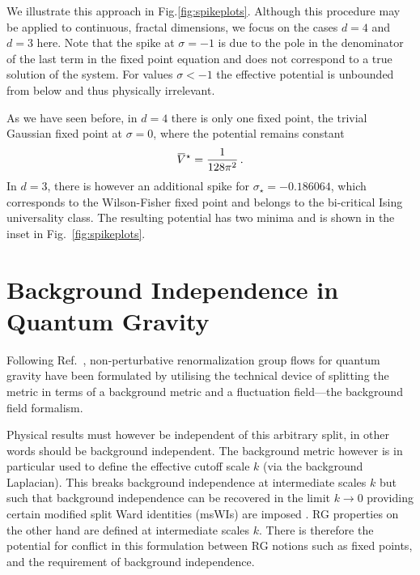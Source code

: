 \documentclass[11pt]{book}
\newcommand{\overbar}[1]{\mkern 1.5mu\overline{\mkern-1.5mu#1\mkern-1.5mu}\mkern 1.5mu}
\newcommand{\bV}{\overbar V}
\numberwithin{equation}{chapter}
\begin{document}
We illustrate this approach in Fig.\ref{fig:spikeplots}.
Although this procedure may be applied to continuous, fractal dimensions, we focus
on the cases $d=4$ and $d=3$ here. Note that the spike at $\sigma = -1$ is due
to the pole in the denominator of the last term in the fixed point equation and
does not correspond to a true solution of the system.
For values $\sigma<-1$ the effective potential is unbounded from below and
thus physically irrelevant.

As we have seen before, in $d=4$ there is only one fixed point, the trivial
Gaussian fixed point at $\sigma = 0$, where the potential remains constant
\begin{align}
  \bV^\star = \frac { 1 }{ 128 \pi^2 } \,.
\end{align}
In $d=3$, there is however an additional spike for $\sigma_\star = -0.186064$,
which corresponds to the Wilson-Fisher fixed point
and belongs to the bi-critical Ising universality class.
The resulting potential has two minima and is shown in the inset in Fig.~\ref{fig:spikeplots}.



\chapter{Background Independence in Quantum Gravity}

\label{ch:tim}

Following Ref.~\cite{Reuter:1996cp},
non-perturbative renormalization group flows for quantum gravity
have been formulated by utilising the technical device of splitting the metric in terms
of a background metric and a fluctuation field---the background field formalism.

Physical results must however be independent of this arbitrary split,
in other words should be background independent.
The background metric however is in particular used
to define the effective cutoff scale $k$ (via the background Laplacian).
This breaks background independence at intermediate scales $k$ but such that background
independence can be recovered in the limit $k\to0$ providing certain modified split Ward
identities (msWIs) are imposed
\cite{Pawlowski:2005xe, Litim:2002hj, Bridle:2013sra, Reuter:1997gx, Litim:1998nf, Litim:2002ce,
Manrique:2009uh, Manrique:2010mq, Manrique:2010am, Dietz:2015owa, Safari:2015dva}.
RG properties on the other hand are defined at intermediate scales $k$.
There is therefore the potential for conflict in this formulation between RG notions such as fixed points,
and the requirement of background independence.
\end{document}
